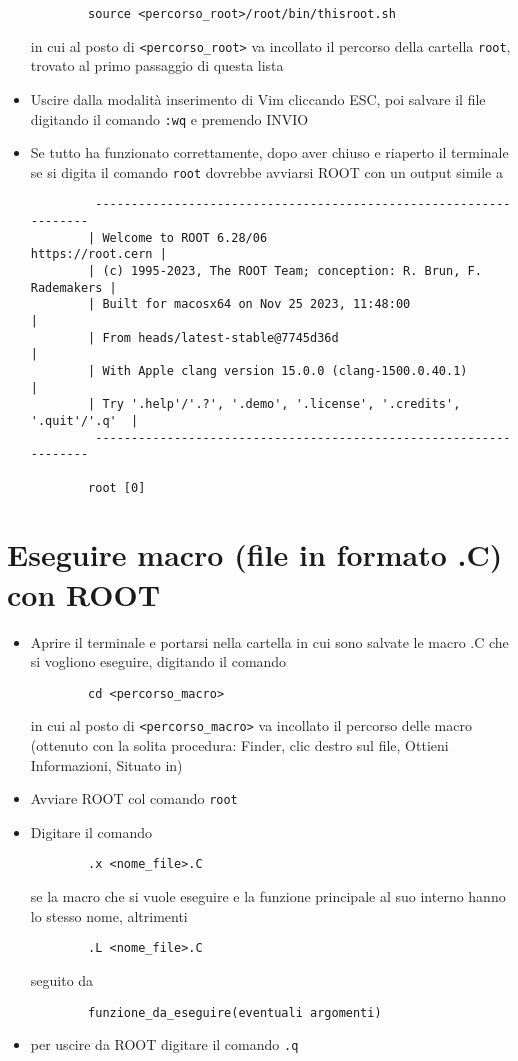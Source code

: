 \begin{itemize}
	\begin{verbatim}
		source <percorso_root>/root/bin/thisroot.sh
	\end{verbatim}
	in cui al posto di \texttt{<percorso\_root>} va incollato il percorso della cartella \texttt{root}, trovato al primo passaggio di questa lista
	\item Uscire dalla modalità inserimento di Vim cliccando ESC, poi salvare il file digitando il comando \texttt{:wq} e premendo INVIO
	\newpage
	\item Se tutto ha funzionato correttamente, dopo aver chiuso e riaperto il terminale se si digita il comando \texttt{root} dovrebbe avviarsi ROOT con un output simile a
	\begin{verbatim}
		 ------------------------------------------------------------------
		| Welcome to ROOT 6.28/06                        https://root.cern |
		| (c) 1995-2023, The ROOT Team; conception: R. Brun, F. Rademakers |
		| Built for macosx64 on Nov 25 2023, 11:48:00                      |
		| From heads/latest-stable@7745d36d                                |
		| With Apple clang version 15.0.0 (clang-1500.0.40.1)              |
		| Try '.help'/'.?', '.demo', '.license', '.credits', '.quit'/'.q'  |
		 ------------------------------------------------------------------
		
		root [0]
	\end{verbatim}
\end{itemize}

\section{Eseguire macro (file in formato .C) con ROOT}
\begin{itemize}
	\item Aprire il terminale e portarsi nella cartella in cui sono salvate le macro .C che si vogliono eseguire, digitando il comando
	\begin{verbatim}
		cd <percorso_macro>
	\end{verbatim}
	in cui al posto di \texttt{<percorso\_macro>} va incollato il percorso delle macro (ottenuto con la solita procedura: Finder, clic destro sul file, Ottieni Informazioni, Situato in)
	\item Avviare ROOT col comando \texttt{root}
	\item Digitare il comando
	\begin{verbatim}
		.x <nome_file>.C
	\end{verbatim}
	se la macro che si vuole eseguire e la funzione principale al suo interno hanno lo stesso nome, altrimenti
	\begin{verbatim}
		.L <nome_file>.C
	\end{verbatim}
	seguito da
	\begin{verbatim}
		funzione_da_eseguire(eventuali argomenti)
	\end{verbatim}
	\item per uscire da ROOT digitare il comando \texttt{.q}
\end{itemize}
